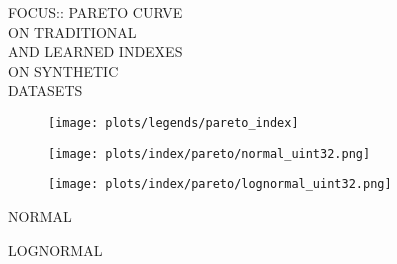\documentclass{article}
\begin{document}
\begin{figure}[!htbp]
\fbox
{
\begin{minipage}[t][0.98\textheight][t]{\textwidth}
\vspace*{-5px}
\centering
    \begin{minipage}{0.23\linewidth}
    \footnotesize{FOCUS::  PARETO CURVE\\ ON TRADITIONAL \\ AND LEARNED INDEXES \\ ON SYNTHETIC \\ DATASETS}
    \end{minipage}
   \begin{minipage}{0.75\linewidth}
        \begin{figure}[H]
        \texttt{[image: plots/legends/pareto\_index]}
        \end{figure}
    \end{minipage}
    \vfill

   \begin{minipage}{0.48\linewidth}
        \begin{figure}[H]
        \texttt{[image: plots/index/pareto/normal\_uint32.png]}
        \end{figure}
    \end{minipage}
    \begin{minipage}{0.48\linewidth}
        \begin{figure}[H]
        \texttt{[image: plots/index/pareto/lognormal\_uint32.png]}
        \end{figure}
    \end{minipage}
    \begin{minipage}{0.48\linewidth}
    \begin{center}
        NORMAL
    \end{center}
    \end{minipage}
    \begin{minipage}{0.48\linewidth}
    \begin{center}
        LOGNORMAL
    \end{center}
    \end{minipage}

    \vfill


\end{minipage}}
\end{figure}
\end{document}
